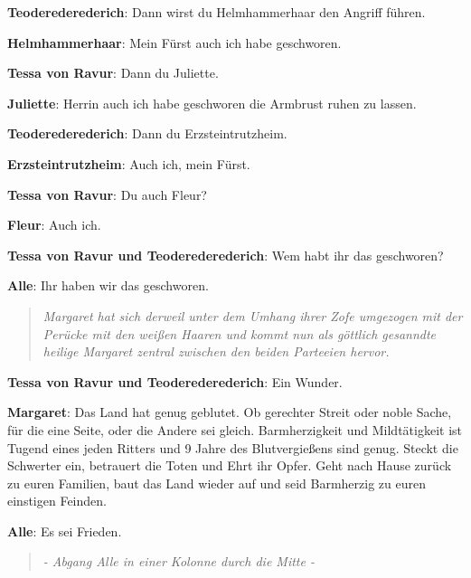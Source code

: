 \documentclass[a5paper,7pt, twocolumn]{book}
\begin{document}
\textbf{Teoderederederich}: Dann wirst du Helmhammerhaar den Angriff führen.

\textbf{Helmhammerhaar}: Mein Fürst auch ich habe geschworen.

\textbf{Tessa von Ravur}: Dann du Juliette.

\textbf{Juliette}: Herrin auch ich habe geschworen die Armbrust ruhen zu lassen.

\textbf{Teoderederederich}: Dann du Erzsteintrutzheim.

\textbf{Erzsteintrutzheim}: Auch ich, mein Fürst.

\textbf{Tessa von Ravur}: Du auch Fleur?

\textbf{Fleur}: Auch ich.

\textbf{Tessa von Ravur und Teoderederederich}: Wem habt ihr das geschworen?

\textbf{Alle}: Ihr haben wir das geschworen.

\begin{quote}
  \textit{Margaret hat sich derweil unter dem Umhang ihrer Zofe umgezogen mit der Perücke mit den weißen Haaren und kommt nun als göttlich gesanndte heilige Margaret zentral zwischen den beiden Parteeien hervor.}
 \end{quote}


\textbf{Tessa von Ravur und Teoderederederich}: Ein Wunder.

\textbf{Margaret}: Das Land hat genug geblutet. Ob gerechter Streit oder noble Sache, für die eine Seite, oder die Andere sei gleich. Barmherzigkeit und Mildtätigkeit ist Tugend eines jeden Ritters und 9 Jahre des Blutvergießens sind genug. Steckt die Schwerter ein, betrauert die Toten und Ehrt ihr Opfer. Geht nach Hause zurück zu euren Familien, baut das Land wieder auf und seid Barmherzig zu euren einstigen Feinden.

\textbf{Alle}: Es sei Frieden.

\begin{quote}
  \textit{- Abgang Alle in einer Kolonne durch die Mitte -
}
 \end{quote}
\end{document}
